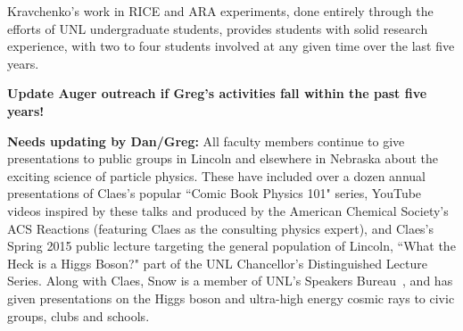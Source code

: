 Kravchenko's work in RICE and ARA experiments, done entirely through the efforts of UNL undergraduate students, provides students with solid research experience, with two to four students involved at any given time over the last five years.  

{\bf Update Auger outreach if Greg's activities fall within the past five years!}

{\bf Needs updating by Dan/Greg:}
All faculty members continue to give presentations to public groups in Lincoln and elsewhere in Nebraska about the exciting science of particle physics. These have included over a dozen annual presentations of Claes's popular ``Comic Book Physics 101" series, YouTube videos inspired by these talks and produced by the American Chemical Society's ACS Reactions (featuring Claes as the consulting physics expert), and Claes's Spring 2015 public lecture targeting the general population of Lincoln, ``What the Heck is a Higgs Boson?" part of the UNL Chancellor's Distinguished Lecture Series.  Along with Claes, Snow is a member of UNL's Speakers Bureau~\cite{bib:speakers}, and has given presentations on the Higgs boson and ultra-high energy cosmic rays to civic groups, clubs and schools.
